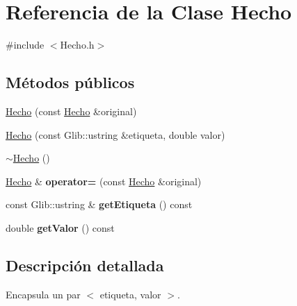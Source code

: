 \hypertarget{classHecho}{\section{\-Referencia de la \-Clase \-Hecho}
\label{classHecho}
}


{\ttfamily \#include $<$\-Hecho.\-h$>$}

\subsection*{\-Métodos públicos}
\begin{DoxyCompactItemize}
\item 
\hyperlink{classHecho_a7bfac84967a673af43766b925df5d650}{\-Hecho} (const \hyperlink{classHecho}{\-Hecho} \&original)
\item 
\hyperlink{classHecho_a0f6fe75ee75ff640130d431f27a08a00}{\-Hecho} (const \-Glib\-::ustring \&etiqueta, double valor)
\item 
\hyperlink{classHecho_a8536263dce459e232a994ee76462eb6b}{$\sim$\-Hecho} ()
\item 
\hypertarget{classHecho_abf03d7117f1b06dcf962d99e359bd2af}{\hyperlink{classHecho}{\-Hecho} \& {\bfseries operator=} (const \hyperlink{classHecho}{\-Hecho} \&original)}\label{classHecho_abf03d7117f1b06dcf962d99e359bd2af}

\item 
\hypertarget{classHecho_a186f4b322ac31544ae9883f7e5f68558}{const \-Glib\-::ustring \& {\bfseries get\-Etiqueta} () const }\label{classHecho_a186f4b322ac31544ae9883f7e5f68558}

\item 
\hypertarget{classHecho_ab18727b45db7d9726b0dce7adebbfe9a}{double {\bfseries get\-Valor} () const }\label{classHecho_ab18727b45db7d9726b0dce7adebbfe9a}

\end{DoxyCompactItemize}


\subsection{\-Descripción detallada}
\-Encapsula un par $<$ etiqueta, valor $>$. 

